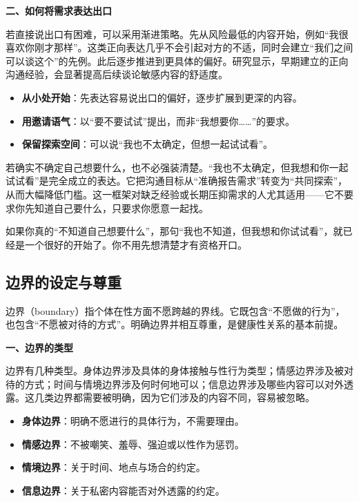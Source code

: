 \documentclass[12pt,UTF8]{ctexbook}
\begin{document}
\textbf{二、如何将需求表达出口}

若直接说出口有困难，可以采用渐进策略。先从风险最低的内容开始，例如“我很喜欢你刚才那样”。这类正向表达几乎不会引起对方的不适，同时会建立“我们之间可以谈这个”的先例。此后逐步推进到更具体的偏好。研究显示，早期建立的正向沟通经验，会显著提高后续谈论敏感内容的舒适度。

\begin{itemize}
\item \textbf{从小处开始}：先表达容易说出口的偏好，逐步扩展到更深的内容。
\item \textbf{用邀请语气}：以“要不要试试”提出，而非“我想要你……”的要求。
\item \textbf{保留探索空间}：可以说“我也不太确定，但想一起试试看”。
\end{itemize}

若确实不确定自己想要什么，也不必强装清楚。“我也不太确定，但我想和你一起试试看”是完全成立的表达。它把沟通目标从“准确报告需求”转变为“共同探索”，从而大幅降低门槛。这一框架对缺乏经验或长期压抑需求的人尤其适用——它不要求你先知道自己要什么，只要求你愿意一起找。

\begin{tcolorbox}[colback=pink!5!white,colframe=red!50!black,title=贴心小叮咛]
如果你真的“不知道自己想要什么”，那句“我也不知道，但我想和你试试看”，就已经是一个很好的开始了。你不用先想清楚才有资格开口。
\end{tcolorbox}

\subsection{边界的设定与尊重}

边界（boundary）指个体在性方面不愿跨越的界线。它既包含“不愿做的行为”，也包含“不愿被对待的方式”。明确边界并相互尊重，是健康性关系的基本前提。

\textbf{一、边界的类型}

边界有几种类型。身体边界涉及具体的身体接触与性行为类型；情感边界涉及被对待的方式；时间与情境边界涉及何时何地可以；信息边界涉及哪些内容可以对外透露。这几类边界都需要被明确，因为它们涉及的内容不同，容易被忽略。

\begin{itemize}
\item \textbf{身体边界}：明确不愿进行的具体行为，不需要理由。
\item \textbf{情感边界}：不被嘲笑、羞辱、强迫或以性作为惩罚。
\item \textbf{情境边界}：关于时间、地点与场合的约定。
\item \textbf{信息边界}：关于私密内容能否对外透露的约定。
\end{itemize}
\end{document}
